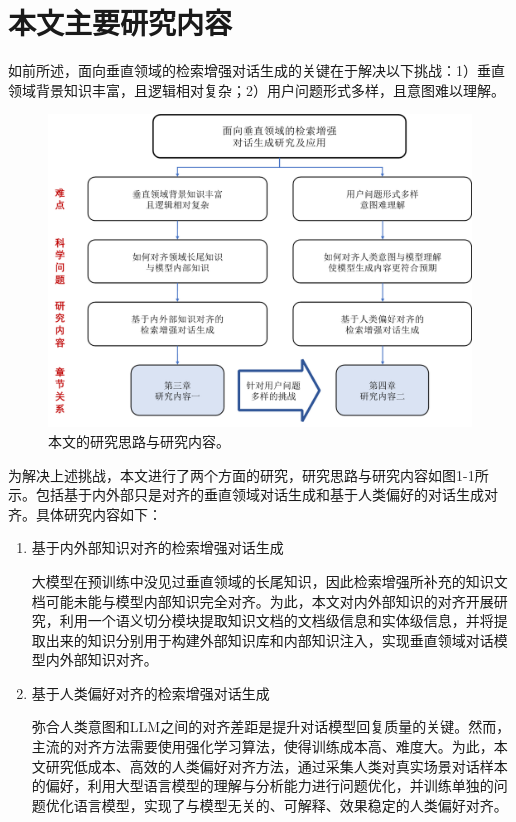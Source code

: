 \section{本文主要研究内容}

如前所述，面向垂直领域的检索增强对话生成的关键在于解决以下挑战：1）垂直领域背景知识丰富，且逻辑相对复杂；2）用户问题形式多样，且意图难以理解。

\begin{figure}[htbp]
	\centering
	\includegraphics[scale=0.55]{Fig/paper_structure.png}
	\caption{\label{research_idea_and_research_content_of_this_paper}本文的研究思路与研究内容。}
\end{figure}

为解决上述挑战，本文进行了两个方面的研究，研究思路与研究内容如图1-1所示。包括基于内外部只是对齐的垂直领域对话生成和基于人类偏好的对话生成对齐。具体研究内容如下：

\begin{enumerate}[topsep = 0 pt, itemsep= 0 pt, parsep=0pt, partopsep=0pt, leftmargin=0pt, itemindent=44pt, labelsep=6pt, listparindent=24pt, label=\arabic*)]
	\item 基于内外部知识对齐的检索增强对话生成
	
	大模型在预训练中没见过垂直领域的长尾知识，因此检索增强所补充的知识文档可能未能与模型内部知识完全对齐。为此，本文对内外部知识的对齐开展研究，利用一个语义切分模块提取知识文档的文档级信息和实体级信息，并将提取出来的知识分别用于构建外部知识库和内部知识注入，实现垂直领域对话模型内外部知识对齐。

	\item 基于人类偏好对齐的检索增强对话生成
	
	弥合人类意图和LLM之间的对齐差距是提升对话模型回复质量的关键。然而，主流的对齐方法需要使用强化学习算法，使得训练成本高、难度大。为此，本文研究低成本、高效的人类偏好对齐方法，通过采集人类对真实场景对话样本的偏好，利用大型语言模型的理解与分析能力进行问题优化，并训练单独的问题优化语言模型，实现了与模型无关的、可解释、效果稳定的人类偏好对齐。
\end{enumerate}

